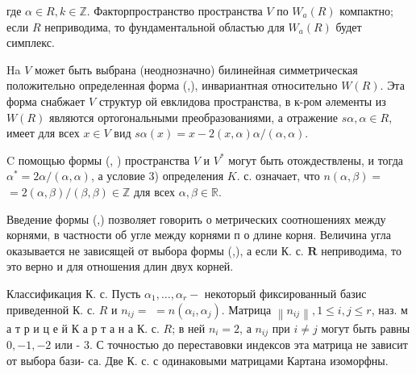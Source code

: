 \documentclass[10pt]{article}
\begin{document}
где $\alpha \in R, k \in \mathbb{Z}$. Факторпространство пространства $V$ по $W_{a}(R)$ компактно; если $R$ неприводима, то фундаментальной областью для $W_{a}(R)$ будет симплекс.



Ha $V$ может быть выбрана (неоднозначно) билинейная симметрическая положительно определенная форма (,), инвариантная относительно $W(R)$. Эта форма снабжает $V$ структур ой евклидова пространства, в к-ром әлементы из $W(R)$ являются ортогональными преобразованиями, а отражение $s \alpha, \alpha \in R$, имеет для всех $x \in V$ вид $s \alpha(x)=x-2(x, \alpha) \alpha /(\alpha, \alpha)$.



C помощью формы (, ) пространства $V$ и $V^{*}$ могут быть отождествлены, и тогда $\alpha^{*}=2 \alpha /(\alpha, \alpha)$, а условие 3) определения $K$. с. означает, что $n(\alpha, \beta)=$ $=2(\alpha, \beta) /(\beta, \beta) \in \mathbb{Z}$ для всех $\alpha, \beta \in \mathbb{R}$.



Введение формы (,) позволяет говорить о метрических соотношениях между корнями, в частности об угле между корнями п о длине корня. Величина угла оказывается не зависящей от выбора формы (,), а если К. с. $\boldsymbol{R}$ неприводима, то это верно и для отношения длин двух корней.



Классификация К. с. Пусть $\alpha_{1}, \ldots, \alpha_{r}-$ некоторый фиксированный базис приведенной К. с. $R$ и $n_{i j}=$ $=n\left(\alpha_{i}, \alpha_{j}\right)$. Матрица $\left\|n_{i j}\right\|, 1 \leqslant i, j \leqslant r$, наз. м а т р и ц е й К а р т а н а К. с. $R$; в ней $n_{i}=2$, а $n_{i j}$ при $i \neq j$ могут быть равны $0,-1,-2$ или - 3. С точностью до переставовки индексов эта матрица не зависит от выбора бази- са. Две К. с. с одинаковыми матрицами Картана изоморфны.
\end{document}
